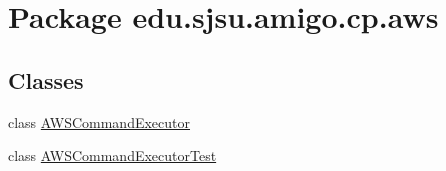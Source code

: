 \hypertarget{namespaceedu_1_1sjsu_1_1amigo_1_1cp_1_1aws}{}\section{Package edu.\+sjsu.\+amigo.\+cp.\+aws}
\label{namespaceedu_1_1sjsu_1_1amigo_1_1cp_1_1aws}
\subsection*{Classes}
\begin{DoxyCompactItemize}
\item 
class \hyperlink{classedu_1_1sjsu_1_1amigo_1_1cp_1_1aws_1_1_a_w_s_command_executor}{A\+W\+S\+Command\+Executor}
\item 
class \hyperlink{classedu_1_1sjsu_1_1amigo_1_1cp_1_1aws_1_1_a_w_s_command_executor_test}{A\+W\+S\+Command\+Executor\+Test}
\end{DoxyCompactItemize}
